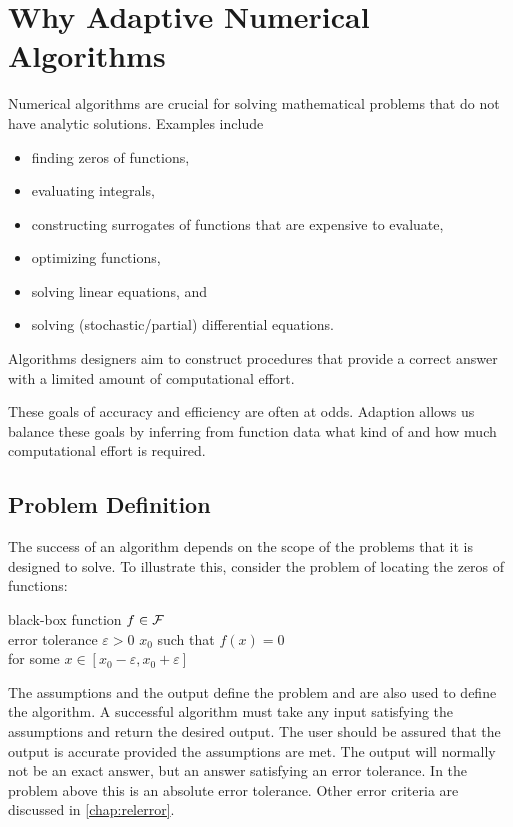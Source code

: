 \chapter{Why Adaptive Numerical Algorithms} \label{chap:ProbAlgo}
Numerical algorithms are crucial for solving mathematical problems that do not have analytic solutions.  Examples include 
\begin{itemize}
    \item finding zeros of functions,
    \item evaluating integrals,
    \item constructing surrogates of functions that are expensive to evaluate,
    \item optimizing functions,
    \item solving linear equations, and
    \item solving (stochastic/partial) differential equations.
\end{itemize}
Algorithms designers aim to construct procedures that provide a correct answer with a limited amount of computational effort.  

These goals of accuracy and efficiency are often at odds.  Adaption allows us balance these goals by inferring from function data what kind of and how much computational effort is required.

\section{Problem Definition}

The success of an algorithm depends on the scope of the problems that it is designed to solve.  To illustrate this, consider the problem of locating the zeros of functions:
\begin{NumProblem} \label{prob:findzero}
%
{black-box function $f \in \mathcal{F}$ \\ error tolerance $\varepsilon > 0$ }%
{$x_0$ such that $f(x) = 0$ \\ 
    \qquad for some $x \in [x_0 - \varepsilon, x_0 + \varepsilon]$}
\end{NumProblem}

The assumptions and the output define the problem and are also used to define the algorithm. A successful algorithm must take any input satisfying the assumptions and return the desired output.   The user should be assured that the output is accurate provided the assumptions are met.  The output will normally not be an exact answer, but an answer satisfying an error tolerance.  In the problem above this is an absolute error tolerance.  Other error criteria are discussed in \cref{chap:relerror}.

